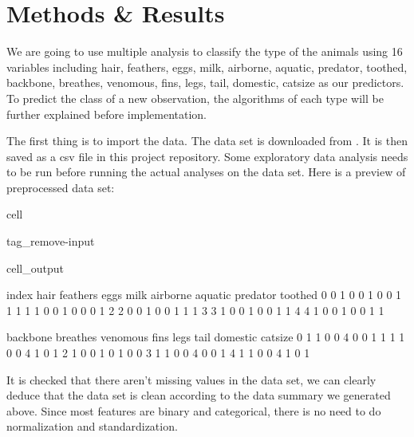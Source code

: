 \documentclass[letterpaper,10pt,english]{jupyterBook}
\begin{document}
\sphinxstepscope


\chapter{Methods \& Results}
\label{\detokenize{analysis:methods-results}}\label{\detokenize{analysis::doc}}
\sphinxAtStartPar
We are going to use multiple analysis to classify the type of the animals using 16 variables including hair, feathers, eggs, milk, airborne, aquatic, predator, toothed, backbone, breathes, venomous, fins, legs, tail, domestic, catsize as our predictors. To predict the class of a new observation, the algorithms of each type will be further explained before implementation.

\sphinxAtStartPar
The first thing is to import the data. The data set is downloaded from . It is then saved as a csv file in this project repository. Some exploratory data analysis needs to be run before running the actual analyses on the data set. Here is a preview of pre\sphinxhyphen{}processed data set:

\begin{sphinxuseclass}{cell}
\begin{sphinxuseclass}{tag_remove-input}\begin{sphinxVerbatimOutput}

\begin{sphinxuseclass}{cell_output}
\begin{sphinxVerbatim}[commandchars=\\\{\}]
   index  hair  feathers  eggs  milk  airborne  aquatic  predator  toothed  \PYGZbs{}
0      0     1         0     0     1         0        0         1        1   
1      1     1         0     0     1         0        0         0        1   
2      2     0         0     1     0         0        1         1        1   
3      3     1         0     0     1         0        0         1        1   
4      4     1         0     0     1         0        0         1        1   

   backbone  breathes  venomous  fins  legs  tail  domestic  catsize  
0         1         1         0     0     4     0         0        1  
1         1         1         0     0     4     1         0        1  
2         1         0         0     1     0     1         0        0  
3         1         1         0     0     4     0         0        1  
4         1         1         0     0     4     1         0        1  
\end{sphinxVerbatim}

\end{sphinxuseclass}\end{sphinxVerbatimOutput}

\end{sphinxuseclass}
\end{sphinxuseclass}
\sphinxAtStartPar
It is checked that there aren’t missing values in the data set, we can clearly deduce that the data set is clean according to the data summary we generated above. Since most features are binary and categorical, there is no need to do normalization and standardization.
\end{document}
